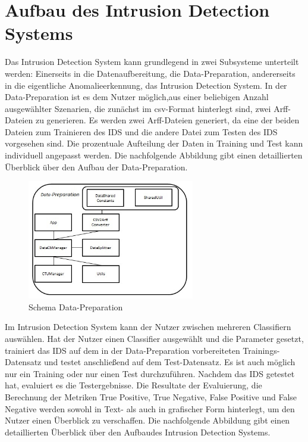 \documentclass[main.tex]{subfiles}
\begin{document}
\section{Aufbau des Intrusion Detection Systems}

Das Intrusion Detection System kann grundlegend in zwei Subsysteme unterteilt werden: Einerseits in die Datenaufbereitung, die Data-Preparation, andererseits in die eigentliche Anomalieerkennung, das Intrusion Detection System.
In der Data-Preparation ist es dem Nutzer möglich,aus einer beliebigen Anzahl ausgewählter Szenarien, die zunächst im csv-Format hinterlegt sind, zwei Arff-Dateien zu generieren. Es werden zwei Arff-Dateien generiert, da eine der beiden Dateien zum Trainieren des IDS und die andere Datei zum Testen des IDS vorgesehen sind. Die prozentuale Aufteilung der Daten in Training und Test kann individuell angepasst werden. Die nachfolgende Abbildung gibt einen detaillierten Überblick über den Aufbau der Data-Preparation.\\

%
\begin{figure}[ht]
 \centering
 \includegraphics[width=0.65\textwidth]{images/Schema_Data_Preparation.jpg}
 \caption{Schema Data-Preparation}
 \label{schema_data_preparation}
\end{figure}


Im Intrusion Detection System kann der Nutzer zwischen mehreren Classifiern auswählen. Hat der Nutzer einen Classifier ausgewählt und die Parameter gesetzt, trainiert das IDS auf dem in der Data-Preparation vorbereiteten Trainings-Datensatz und testet anschließend auf dem Test-Datensatz. Es ist auch möglich nur ein Training oder nur einen Test durchzuführen. Nachdem das IDS getestet hat, evaluiert es die Testergebnisse. Die Resultate der Evaluierung, die Berechnung der Metriken True Positive, True Negative, False Positive und False Negative werden sowohl in Text- als auch in grafischer Form hinterlegt, um den Nutzer einen Überblick zu verschaffen. 
Die nachfolgende Abbildung gibt einen detaillierten Überblick über den Aufbaudes Intrusion Detection Systems. \\
\end{document}
